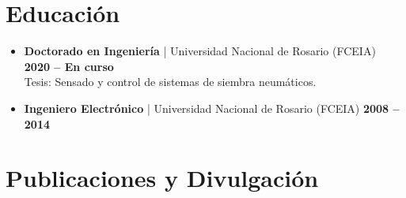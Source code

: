 \documentclass[11pt,a4paper]{article}
\begin{document}
\section{Educación}
\begin{itemize}[leftmargin=0.5cm, noitemsep]
    \item \textbf{Doctorado en Ingeniería} | Universidad Nacional de Rosario (FCEIA) \hfill \textbf{2020 -- En curso} \\ 
    Tesis: Sensado y control de sistemas de siembra neumáticos.
    \item \textbf{Ingeniero Electrónico} | Universidad Nacional de Rosario (FCEIA) \hfill \textbf{2008 -- 2014}
\end{itemize}

\section{Publicaciones y Divulgación}
\end{document}
